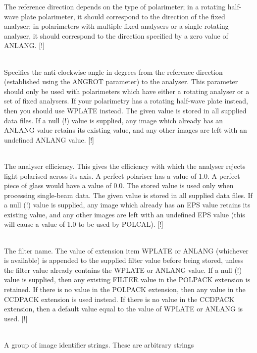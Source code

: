 \documentclass[twoside,11pt]{article}
\newcommand{\htmlref}[2]{#1}
\renewcommand{\_}{\texttt{\symbol{95}}}
\newcommand{\sstsubsection}[1]{ \item[{#1}] \mbox{} \\}
\newcommand{\sstsubsection}[1]{\item[{#1}]}
\begin{document}
{{{         The reference direction depends on the type of polarimeter; in a
         rotating half-wave plate polarimeter, it should correspond to the
         direction of the fixed analyser; in polarimeters with multiple
         fixed analysers or a single rotating analyser, it should
         correspond to the direction specified by a zero value of ANLANG. [!]
      }
      \sstsubsection{
         ANLANG = \_REAL (Read)
      }{
         Specifies the anti-clockwise angle in degrees from the reference
         direction (established using the ANGROT parameter) to the
         analyser. This parameter should only be used with polarimeters
         which have either a rotating analyser or a set of fixed
         analysers. If your polarimetry has a rotating half-wave plate
         instead, then you should use WPLATE instead. The given value is
         stored in all supplied data files. If a null (!) value is
         supplied, any image which already has an ANLANG value retains its
         existing value, and any other images are left with an undefined
         ANLANG value. [!]
      }
      \sstsubsection{
         EPS = \_REAL (Read)
      }{
         The analyser efficiency. This gives the efficiency with which the
         analyser rejects light polarised across its axis. A perfect
         polariser has a value of 1.0. A perfect piece of glass would have
         a value of 0.0. The stored value is used only when processing
         single-beam data. The given value is stored in all supplied data
         files. If a null (!) value is supplied, any image which already
         has an EPS value retains its existing value, and any other images
         are left with an undefined EPS value (this will cause a value of
         1.0 to be used by \htmlref{POLCAL}{POLCAL}). [!]
      }
      \sstsubsection{
         FILTER = LITERAL (Read)
      }{
         The filter name. The value of extension item WPLATE or ANLANG
         (whichever is available) is appended to the supplied filter value
         before being stored, unless the filter value already contains the
         WPLATE or ANLANG value. If a null (!) value is supplied, then
         any existing FILTER value in the POLPACK extension is retained. If
         there is no value in the POLPACK extension, then any value in the
         CCDPACK extension is used instead. If there is no value in the
         CCDPACK extension, then a default value equal to the value of WPLATE
         or ANLANG is used. [!]
      }
      \sstsubsection{
         IMGID = LITERAL (Read)
      }{
         A group of image identifier strings. These are arbitrary strings
}}}
\end{document}
